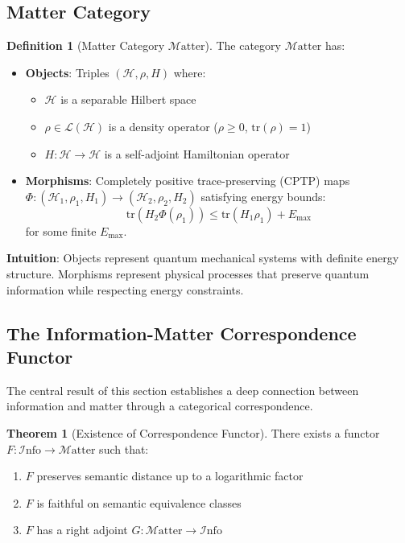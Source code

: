 \documentclass[11pt]{article}
\theoremstyle{definition}
\newtheorem{definition}{Definition}[section]
\newtheorem{theorem}{Theorem}[section]
\newcommand{\Info}{\mathcal{I}\text{nfo}}
\newcommand{\Matter}{\mathcal{M}\text{atter}}
\newcommand{\Hil}{\mathcal{H}}
\newcommand{\tr}{\text{tr}}
\begin{document}
\subsection{Matter Category}

\begin{definition}[Matter Category $\Matter$]
The category $\Matter$ has:
\begin{itemize}
\item \textbf{Objects}: Triples $(\Hil, \rho, H)$ where:
  \begin{itemize}
  \item $\Hil$ is a separable Hilbert space
  \item $\rho \in \mathcal{L}(\Hil)$ is a density operator ($\rho \geq 0$, $\tr(\rho) = 1$)
  \item $H: \Hil \to \Hil$ is a self-adjoint Hamiltonian operator
  \end{itemize}
\item \textbf{Morphisms}: Completely positive trace-preserving (CPTP) maps $\Phi: (\Hil_1, \rho_1, H_1) \to (\Hil_2, \rho_2, H_2)$ satisfying energy bounds:
  \begin{equation}
  \tr(H_2 \Phi(\rho_1)) \leq \tr(H_1 \rho_1) + E_{\text{max}}
  \end{equation}
  for some finite $E_{\text{max}}$.
\end{itemize}
\end{definition}

\textbf{Intuition}: Objects represent quantum mechanical systems with definite energy structure. Morphisms represent physical processes that preserve quantum information while respecting energy constraints.

\subsection{The Information-Matter Correspondence Functor}

The central result of this section establishes a deep connection between information and matter through a categorical correspondence.

\begin{theorem}[Existence of Correspondence Functor]
There exists a functor $F: \Info \to \Matter$ such that:
\begin{enumerate}
\item $F$ preserves semantic distance up to a logarithmic factor
\item $F$ is faithful on semantic equivalence classes
\item $F$ has a right adjoint $G: \Matter \to \Info$
\end{enumerate}
\end{theorem}
\end{document}
